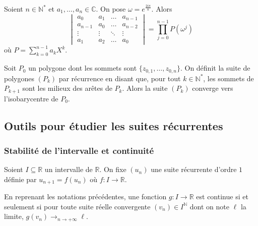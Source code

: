 	\begin{proposition}
		Soient $n \in \mathbb{N}^*$ et $a_1, \dots, a_n \in \mathbb{C}$. On pose $\omega = e^{\frac{2i\pi}{n}}$. Alors
		\[ \begin{vmatrix} a_0 & a_1 & \dots & a_{n-1} \\ a_{n-1} & a_0 & \dots & a_{n-2}\\ \vdots & \vdots & \ddots & \vdots \\ a_1 & a_2 & \dots & a_0 \end{vmatrix} = \prod_{j=0}^{n-1} P(\omega^j) \]
		où $P = \sum_{k=0}^{n-1} a_k X^k$.
	\end{proposition}
	
	
	\begin{application}
		Soit $P_0$ un polygone dont les sommets sont $\{ z_{0,1}, \dots, z_{0,n} \}$. On définit la suite de polygones $(P_k)$ par récurrence en disant que, pour tout $k \in \mathbb{N}^*$, les sommets de $P_{k+1}$ sont les milieux des arêtes de $P_k$.
		\newpar
		Alors la suite $(P_k)$ converge vers l'isobarycentre de $P_0$.
	\end{application}
	
	\newpage
	
	\subsection{Outils pour étudier les suites récurrentes}
	
	\subsubsection{Stabilité de l'intervalle et continuité}
	
	
	Soient $I \subseteq \mathbb{R}$ un intervalle de $\mathbb{R}$. On fixe $(u_n)$ une suite récurrente d'ordre $1$ définie par $u_{n+1} = f(u_n)$ où $f : I \rightarrow \mathbb{R}$.
	
	\begin{theorem}
		En reprenant les notations précédentes, une fonction $g : I \rightarrow \mathbb{R}$ est continue si et seulement si pour toute suite réelle convergente $(v_n) \in I^{\mathbb{N}}$ dont on note $\ell$ la limite, $g(v_n) \longrightarrow_{n \rightarrow +\infty} \ell$.
	\end{theorem}
	
